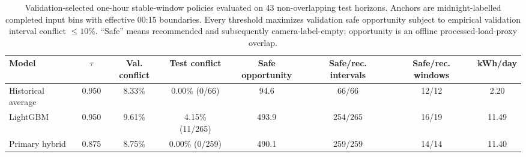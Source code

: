 \begin{table}[!t]
\caption{Validation-selected one-hour stable-window policies evaluated on 43 non-overlapping test horizons. Anchors are midnight-labelled completed input bins with effective 00:15 boundaries. Every threshold maximizes validation safe opportunity subject to empirical validation interval conflict $\leq10\%$. ``Safe'' means recommended and subsequently camera-label-empty; opportunity is an offline processed-load-proxy overlap.}
\label{tab:policy-comparison}
\centering
\footnotesize
\setlength{\tabcolsep}{3pt}
\begin{tabular}{lccccccc}
\toprule
Model & $\tau$ & Val. conflict & Test conflict & Safe opportunity & Safe/rec. intervals & Safe/rec. windows & kWh/day \\
\midrule
Historical average & 0.950 & 8.33\% & 0.00\% (0/66) & 94.6 & 66/66 & 12/12 & 2.20 \\
LightGBM & 0.950 & 9.61\% & 4.15\% (11/265) & 493.9 & 254/265 & 16/19 & 11.49 \\
Primary hybrid & 0.875 & 8.75\% & 0.00\% (0/259) & 490.1 & 259/259 & 14/14 & 11.40 \\
\bottomrule
\end{tabular}
\end{table}
